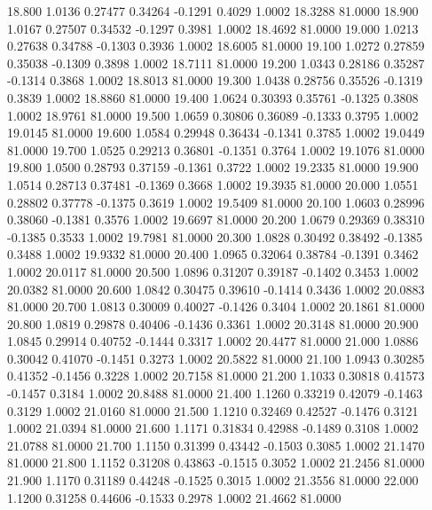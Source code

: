   18.800   1.0136   0.27477   0.34264  -0.1291   0.4029   1.0002  18.3288  81.0000
  18.900   1.0167   0.27507   0.34532  -0.1297   0.3981   1.0002  18.4692  81.0000
  19.000   1.0213   0.27638   0.34788  -0.1303   0.3936   1.0002  18.6005  81.0000
  19.100   1.0272   0.27859   0.35038  -0.1309   0.3898   1.0002  18.7111  81.0000
  19.200   1.0343   0.28186   0.35287  -0.1314   0.3868   1.0002  18.8013  81.0000
  19.300   1.0438   0.28756   0.35526  -0.1319   0.3839   1.0002  18.8860  81.0000
  19.400   1.0624   0.30393   0.35761  -0.1325   0.3808   1.0002  18.9761  81.0000
  19.500   1.0659   0.30806   0.36089  -0.1333   0.3795   1.0002  19.0145  81.0000
  19.600   1.0584   0.29948   0.36434  -0.1341   0.3785   1.0002  19.0449  81.0000
  19.700   1.0525   0.29213   0.36801  -0.1351   0.3764   1.0002  19.1076  81.0000
  19.800   1.0500   0.28793   0.37159  -0.1361   0.3722   1.0002  19.2335  81.0000
  19.900   1.0514   0.28713   0.37481  -0.1369   0.3668   1.0002  19.3935  81.0000
  20.000   1.0551   0.28802   0.37778  -0.1375   0.3619   1.0002  19.5409  81.0000
  20.100   1.0603   0.28996   0.38060  -0.1381   0.3576   1.0002  19.6697  81.0000
  20.200   1.0679   0.29369   0.38310  -0.1385   0.3533   1.0002  19.7981  81.0000
  20.300   1.0828   0.30492   0.38492  -0.1385   0.3488   1.0002  19.9332  81.0000
  20.400   1.0965   0.32064   0.38784  -0.1391   0.3462   1.0002  20.0117  81.0000
  20.500   1.0896   0.31207   0.39187  -0.1402   0.3453   1.0002  20.0382  81.0000
  20.600   1.0842   0.30475   0.39610  -0.1414   0.3436   1.0002  20.0883  81.0000
  20.700   1.0813   0.30009   0.40027  -0.1426   0.3404   1.0002  20.1861  81.0000
  20.800   1.0819   0.29878   0.40406  -0.1436   0.3361   1.0002  20.3148  81.0000
  20.900   1.0845   0.29914   0.40752  -0.1444   0.3317   1.0002  20.4477  81.0000
  21.000   1.0886   0.30042   0.41070  -0.1451   0.3273   1.0002  20.5822  81.0000
  21.100   1.0943   0.30285   0.41352  -0.1456   0.3228   1.0002  20.7158  81.0000
  21.200   1.1033   0.30818   0.41573  -0.1457   0.3184   1.0002  20.8488  81.0000
  21.400   1.1260   0.33219   0.42079  -0.1463   0.3129   1.0002  21.0160  81.0000
  21.500   1.1210   0.32469   0.42527  -0.1476   0.3121   1.0002  21.0394  81.0000
  21.600   1.1171   0.31834   0.42988  -0.1489   0.3108   1.0002  21.0788  81.0000
  21.700   1.1150   0.31399   0.43442  -0.1503   0.3085   1.0002  21.1470  81.0000
  21.800   1.1152   0.31208   0.43863  -0.1515   0.3052   1.0002  21.2456  81.0000
  21.900   1.1170   0.31189   0.44248  -0.1525   0.3015   1.0002  21.3556  81.0000
  22.000   1.1200   0.31258   0.44606  -0.1533   0.2978   1.0002  21.4662  81.0000

